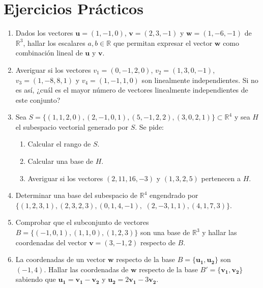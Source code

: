 \documentclass[a4paper]{article}
\begin{document}
\section*{Ejercicios Prácticos}
\begin{enumerate}[leftmargin=*]
\item Dados los vectores $\mathbf{u}=(1,-1,0)$, $\mathbf{v}=(2,3,-1)$ y $\mathbf{w}=(1,-6,-1)$ de $\mathbb{R}^3$, hallar los escalares $a,b\in \mathbb{R}$ que permitan expresar el vector $\mathbf{w}$ como combinación lineal de $\mathbf{u}$ y $\mathbf{v}$.

\item Averiguar si los vectores $v_1=(0,-1,2,0)$, $v_2=(1,3,0,-1)$, $v_3=(1,-8,8,1)$ y $v_4=(1,-1,1,0)$ son linealmente independientes. Si no es así, ¿cuál es el mayor número de vectores linealmente independientes de este conjunto?

\item Sea $S=\{(1,1,2,0),(2,-1,0,1),(5,-1,2,2),(3,0,2,1)\}\subset \mathbb{R}^4$ y sea $H$ el subespacio vectorial generado por $S$. Se pide:
\begin{enumerate}
\item Calcular el rango de $S$.
\item Calcular una base de $H$.
\item Averiguar si los vectores $(2,11,16,-3)$ y $(1,3,2,5)$ pertenecen a $H$.
\end{enumerate}

\item Determinar una base del subespacio de $\mathbb{R}^4$ engendrado por $\{(1,2,3,1),(2,3,2,3), (0,1,4,-1),$ $(2,-3,1,1),(4,1,7,3)\}$.

\item Comprobar que el subconjunto de vectores $B=\{(-1,0,1),(1,1,0),(1,2,3)\}$ son una base de $\mathbb{R}^3$ y hallar las coordenadas del vector $\mathbf{v}=(3,-1,2)$ respecto de $B$.

\item La coordenadas de un vector $\mathbf{w}$ respecto de la base $B=\{\mathbf{u_1},\mathbf{u_2}\}$ son $(-1,4)$. Hallar las coordenadas de $\mathbf{w}$ respecto de la base $B'=\{\mathbf{v_1},\mathbf{v_2}\}$ sabiendo que $\mathbf{u_1}=\mathbf{v_1}-\mathbf{v_2}$ y $\mathbf{u_2}=2\mathbf{v_1}-3\mathbf{v_2}$.

\end{enumerate}
\end{document}
